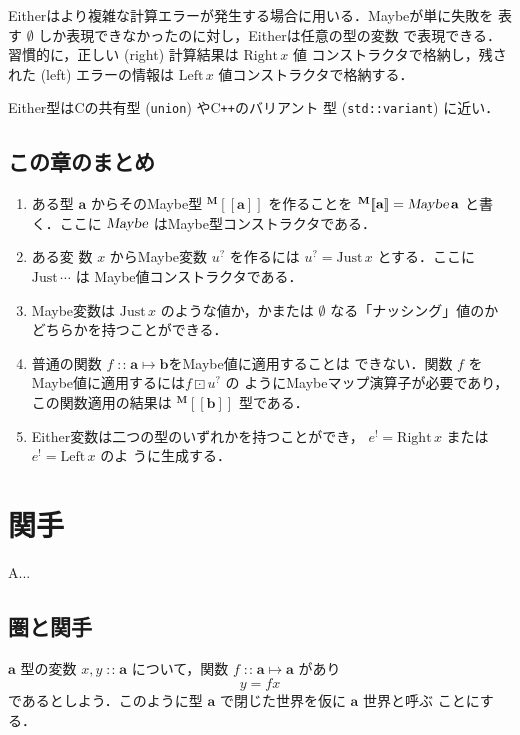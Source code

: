 \documentclass[a5paper,twoside,fleqn,draft]{jsbook}
\def\[{[\![}
\def\]{]\!]}
\newcommand{\programminglanguage}[1]{\textsf{#1}}
\newcommand{\clang}{\programminglanguage{C}}
\newcommand{\cxx}{\programminglanguage{C}\texttt{++}}
\newenvironment{leader}{\begingroup\gt}{\endgroup}
\newcommand{\code}[1]{\texttt{#1}}
\newcommand{\mNothing}{\emptyset}
\DeclareMathOperator{\mIn}{{:\!:}}
\DeclareMathOperator{\mMapMaybe}{\boxdot}
\DeclareMathOperator{\mMapsTo}{\mapsto}
\newcommand{\mType}[1]{\mathbf{#1}} %
\newcommand{\mA}{\mType{a}}
\newcommand{\mB}{\mType{b}}
\newcommand{\mTypeAssemble}[2]{{}^\mType{#1}\[\mType{#2}\]}
\newcommand{\mMaybeType}[1]{\mTypeAssemble{M}{#1}}
\newcommand{\mTypeConstructor}[1]{\textsl{#1}}
\DeclareMathOperator{\mMaybeTypeConstructor}{\mTypeConstructor{Maybe}}
\newcommand{\mValueConstructor}[1]{\mathrm{#1}}
\newcommand{\mValueWith}[2]{\mValueConstructor{#1}\,#2}
\newcommand{\mLeftWith}[1]{\mValueWith{Left}{#1}}
\newcommand{\mRightWith}[1]{\mValueWith{Right}{#1}}
\newcommand{\mJustWith}[1]{\mValueWith{Just}{#1}}
\newcommand{\mEither}[1]{{#1}^!}
\newcommand{\mMaybe}[1]{{#1}^?}
\newcommand{\mProjEXP}[2]{#1\mMapsTo#2} %
\begin{document}
Eitherはより複雑な計算エラーが発生する場合に用いる．Maybeが単に失敗を
表す $\mNothing$ しか表現できなかったのに対し，Eitherは任意の型の変数
で表現できる．習慣的に，正しい (right) 計算結果は $\mRightWith{x}$ 値
コンストラクタで格納し，残された (left) エラーの情報は $\mLeftWith{x}$
値コンストラクタで格納する．

Either型は\clang の共有型 (\code{union}) や\cxx のバリアント
型 (\code{std::variant}) に近い．

\section{この章のまとめ}

\begin{enumerate}
\item ある型 $\mA $ からそのMaybe型 $\mMaybeType{a}$ を作ることを
  $\mMaybeType{a}=\mMaybeTypeConstructor\mA $ と書く．ここに
  $\mMaybeTypeConstructor$ はMaybe型コンストラクタである．\item ある変
  数 $x$ からMaybe変数 $\mMaybe{u}$ を作るには
  $\mMaybe{u}=\mJustWith{x}$ とする．ここに $\mJustWith{\dotsb}$ は
  Maybe値コンストラクタである．
\item Maybe変数は $\mJustWith{x}$ のような値か，かまたは $\mNothing$
  なる「ナッシング」値のかどちらかを持つことができる．
\item 普通の関数 $f\mIn\mProjEXP{\mA }{\mB }$をMaybe値に適用することは
  できない．関数 $f$ をMaybe値に適用するには$f\mMapMaybe\mMaybe{u}$ の
  ようにMaybeマップ演算子が必要であり，この関数適用の結果は
  $\mMaybeType{b}$ 型である．
\item Either変数は二つの型のいずれかを持つことができ，
  $\mEither{e}=\mRightWith{x}$ または$\mEither{e}=\mLeftWith{x}$ のよ
  うに生成する．
\end{enumerate}

\chapter{関手}
\label{ch:functor}

\begin{leader}
A...
\end{leader}

\section{圏と関手}

$\mA $ 型の変数 $x,y\mIn\mA$ について，関数 $f\mIn\mA\mMapsTo\mA$ があり
\begin{equation}
  y
  =fx
\end{equation}
であるとしよう．このように型 $\mA$ で閉じた世界を仮に $\mA$ 世界と呼ぶ
ことにする．
\end{document}

